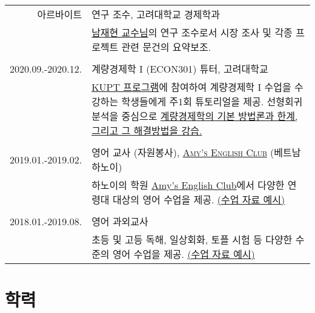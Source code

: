 \documentclass[a4paper]{article} %
\begin{document}
\begin{tabular}{r|p{11cm}}
	\textsc{아르바이트} & 연구 조수, 고려대학교 경제학과 \\ 
	& \footnotesize{
        \href{http://econ.korea.ac.kr/econ/?dt_team=%EB%82%A8%EC%9E%AC%ED%98%84-jae-nahm}{남재현
    교수님}의 연구 조수로서 시장 조사 및 각종 프로젝트 관련 문건의
요약 보조.}\\
	\multicolumn{2}{c}{} \\
	
	\textsc{2020.09.-2020.12.} & 계량경제학 I (ECON301) 튜터, 고려대학교 \\
	& \footnotesize{	\href{https://ctl.korea.ac.kr/front/content/view.do?content_seq=14}{KUPT
			프로그램}에 참여하여 계량경제학 I 수업을 수강하는 학생들에게 주1회
		튜토리얼을 제공. 선형회귀분석을 중심으로
    \href{https://drive.google.com/file/d/1CJsRSpE2bg21PmoyaiDFtcpwFTPXwAAa/view}{계량경제학의
기본 방법론과 한계, 그리고 그 해결방법을 강습.}} \\
	\multicolumn{2}{c}{} \\
	
    \textsc{2019.01.-2019.02.} & 영어 교사 (자원봉사), 	\href{https://www.facebook.com/amy.englishclub}{\textsc{Amy's English Club}} (베트남 하노이) \emph{}\\
    & \footnotesize{하노이의 학원
        \href{https://www.facebook.com/amy.englishclub}{Amy's English Club}에서 다양한 연령대 대상의
        영어 수업을 제공.
        \href{https://drive.google.com/file/d/1Wb8tWkcThmKiy-Rv2OMMWRkrg-6ddooL/view}{(수업
    자료 예시)}}\\
	\multicolumn{2}{c}{} \\
	
	
	\textsc{2018.01.-2019.08.} & 영어 과외교사 \emph{}\\
	& \footnotesize{초등 및 고등 독해, 일상회화, 토플 시험 등 다양한 수준의 영어 수업을 제공.
        \href{https://drive.google.com/file/d/1uuF_h_x29hSJ3l61F7Kzxi_kKohBBTpJ/view}{(수업 자료 예시)}	
    }\\
	
\end{tabular}


\section{학력}
\end{document}
